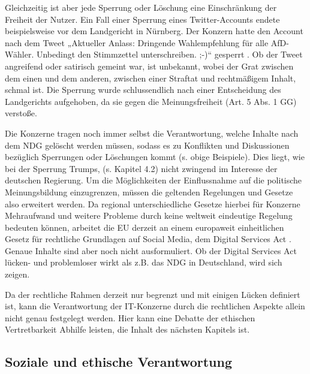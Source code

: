 Gleichzeitig ist aber jede Sperrung oder Löschung eine Einschränkung der Freiheit der Nutzer. Ein Fall einer Sperrung eines Twitter-Accounts endete beispielsweise vor dem Landgericht in Nürnberg. Der Konzern hatte den Account nach dem Tweet „Aktueller Anlass: Dringende Wahlempfehlung für alle AfD-Wähler. Unbedingt den Stimmzettel unterschreiben. ;-)“ gesperrt \autocite[vgl.][]{GerichtsbeschlussSperrungTwitter}. Ob der Tweet angreifend oder satirisch gemeint war, ist unbekannt, wobei der Grat zwischen dem einen und dem anderen, zwischen einer Straftat und rechtmäßigem Inhalt, schmal ist. Die Sperrung wurde schlussendlich nach einer Entscheidung des Landgerichts aufgehoben, da sie gegen die Meinungsfreiheit (Art. 5 Abs. 1 GG) verstoße.

Die Konzerne tragen noch immer selbst die Verantwortung, welche Inhalte nach dem NDG gelöscht werden müssen, sodass es zu Konflikten und Diskussionen bezüglich Sperrungen oder Löschungen kommt (s. obige Beispiele). Dies liegt, wie bei der Sperrung Trumps, (s. Kapitel 4.2) nicht zwingend im Interesse der deutschen Regierung. Um die Möglichkeiten der Einflussnahme auf die politische Meinungsbildung einzugrenzen, müssen die geltenden Regelungen und Gesetze also erweitert werden. Da regional unterschiedliche Gesetze hierbei für Konzerne Mehraufwand und weitere Probleme durch keine weltweit eindeutige Regelung bedeuten können, arbeitet die EU derzeit an einem europaweit einheitlichen Gesetz für rechtliche Grundlagen auf Social Media, dem \glqq Digital Services Act\grqq{} \autocite[vgl.][]{DigitalServicesAct}. Genaue Inhalte sind aber noch nicht ausformuliert. Ob der Digital Services Act lücken- und problemloser wirkt als z.B. das NDG in Deutschland, wird sich zeigen. 

Da der rechtliche Rahmen derzeit nur begrenzt und mit einigen Lücken definiert ist, kann die Verantwortung der IT-Konzerne durch die rechtlichen Aspekte allein nicht genau festgelegt werden. Hier kann eine Debatte der ethischen Vertretbarkeit Abhilfe leisten, die Inhalt des nächsten Kapitels ist.


\subsection{Soziale und ethische Verantwortung}


